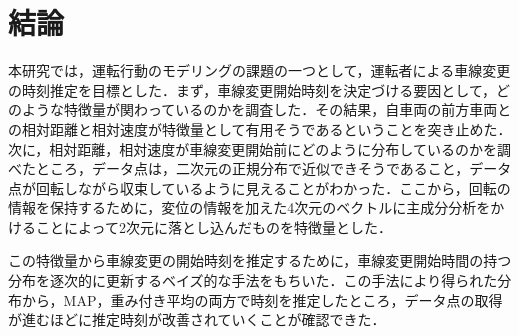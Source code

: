 \chapter{結論}
本研究では，運転行動のモデリングの課題の一つとして，運転者による車線変更の時刻推定を目標とした．まず，車線変更開始時刻を決定づける要因として，どのような特徴量が関わっているのかを調査した．その結果，自車両の前方車両との相対距離と相対速度が特徴量として有用そうであるということを突き止めた．次に，相対距離，相対速度が車線変更開始前にどのように分布しているのかを調べたところ，データ点は，二次元の正規分布で近似できそうであること，データ点が回転しながら収束しているように見えることがわかった．ここから，回転の情報を保持するために，変位の情報を加えた4次元のベクトルに主成分分析をかけることによって2次元に落とし込んだものを特徴量とした．
\par
この特徴量から車線変更の開始時刻を推定するために，車線変更開始時間の持つ分布を逐次的に更新するベイズ的な手法をもちいた．この手法により得られた分布から，MAP，重み付き平均の両方で時刻を推定したところ，データ点の取得が進むほどに推定時刻が改善されていくことが確認できた．

